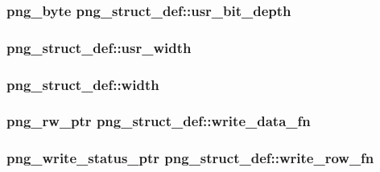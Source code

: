 \subsubsection[{usr\+\_\+bit\+\_\+depth}]{\setlength{\rightskip}{0pt plus 5cm}png\+\_\+byte png\+\_\+struct\+\_\+def\+::usr\+\_\+bit\+\_\+depth}\label{structpng__struct__def_af30e53e1cad0830302030152c81cc59f}
\hypertarget{structpng__struct__def_a6fb8c450c20bc0161211b00a18db173e}{}
\subsubsection[{usr\+\_\+width}]{ png\+\_\+struct\+\_\+def\+::usr\+\_\+width}\label{structpng__struct__def_a6fb8c450c20bc0161211b00a18db173e}
\hypertarget{structpng__struct__def_abb11531c781ea91b63d0fa1af122eaab}{}
\subsubsection[{width}]{ png\+\_\+struct\+\_\+def\+::width}\label{structpng__struct__def_abb11531c781ea91b63d0fa1af122eaab}
\hypertarget{structpng__struct__def_acc53cd87f0ffc4d1f67da7e10a94af39}{}
\subsubsection[{write\+\_\+data\+\_\+fn}]{\setlength{\rightskip}{0pt plus 5cm}png\+\_\+rw\+\_\+ptr png\+\_\+struct\+\_\+def\+::write\+\_\+data\+\_\+fn}\label{structpng__struct__def_acc53cd87f0ffc4d1f67da7e10a94af39}
\hypertarget{structpng__struct__def_a1ea44e185e0f8bdd7299f93fd017c32c}{}
\subsubsection[{write\+\_\+row\+\_\+fn}]{\setlength{\rightskip}{0pt plus 5cm}png\+\_\+write\+\_\+status\+\_\+ptr png\+\_\+struct\+\_\+def\+::write\+\_\+row\+\_\+fn}\label{structpng__struct__def_a1ea44e185e0f8bdd7299f93fd017c32c}
\hypertarget{structpng__struct__def_a5bfc727f45873680edacf4d12bebc8f4}{}
